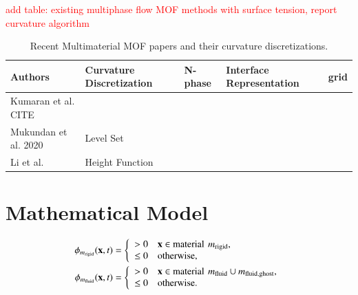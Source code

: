 \documentclass[preprint,12pt]{Definitions/elsarticle}
\newcommand{\mb}{\mathbf}
\newcommand{\tn}{\textnormal}
\begin{document}
\textcolor{red}{add table: existing multiphase flow MOF methods with surface tension, report curvature algorithm}

\noindent{}


\begin{table}[H]
	\small
	\centering
	\caption{Recent Multimaterial MOF papers and their curvature discretizations.}
	\renewcommand{\arraystretch}{1.2} 
	\begin{tabular}{|l|l|l|l|l|}
		\hline
		Authors   & Curvature Discretization  & N-phase & Interface Representation & grid \\ \hline
		Kumaran et al. CITE &  & &  \\
		Mukundan et al. 2020 \cite{mukundan2020MOF}  & Level Set  & &  \\
		Li et al.\cite{LiETAL2015IncompressibleMultiphase} & Height Function & &  \\
		\hline
	\end{tabular}
	\label{curvaturediscretization_comparison}
\end{table}

\FloatBarrier
\section{Mathematical Model}
	\begin{align}
		\phi_{m_\textrm{rigid}}(\mb{x},t) &= \left\{
		\begin{array}{ll}
			> 0 & \mb{x} \in \tn{material}\,\: m_\textrm{rigid}, \\ 
			\leq 0 & \tn{otherwise},
		\end{array}
		\right.\\
		\phi_{m_\textrm{fluid}}(\mb{x},t) &= \left\{
		\begin{array}{ll}
			> 0 & \mb{x} \in \tn{material}\,\: m_\textrm{fluid}\cup m_\textrm{fluid,ghost}, \\ 
			\leq 0 & \tn{otherwise}.
		\end{array}
		\right.
	\end{align}
\end{document}
